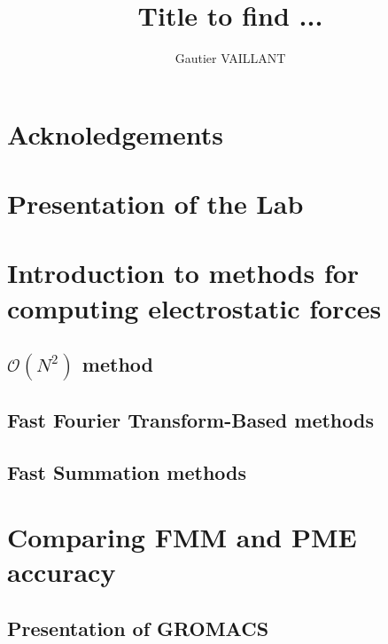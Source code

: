 \documentclass[12pt,twoside,a4paper]{report}
\title{Title to find ...}
\author{Gautier VAILLANT}
\begin{document}
\maketitle

\chapter*{Acknoledgements}


\tableofcontents

\chapter*{Presentation of the Lab}

\chapter{Introduction to methods for computing electrostatic forces}

\section{$\mathcal{O}(N^2)$ method }
\section{Fast Fourier Transform-Based methods}
\section{Fast Summation methods}

\chapter{Comparing FMM and PME accuracy}

\section{Presentation of GROMACS}
\end{document}
